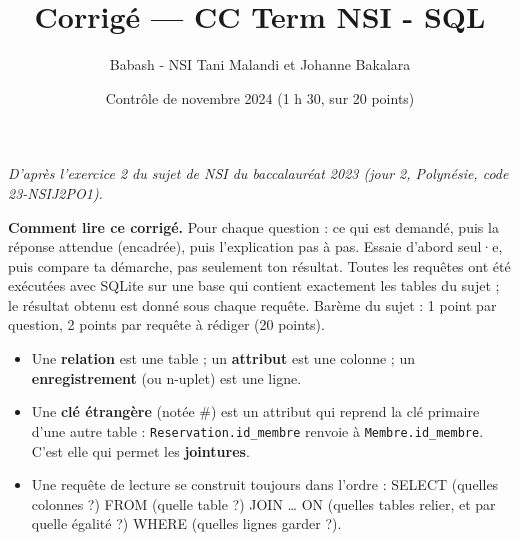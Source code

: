 \documentclass[11pt, a4paper]{exam}
\title{Corrigé — CC Term NSI - SQL}
\author{Babash - NSI Tani Malandi et Johanne Bakalara}
\date{Contrôle de novembre 2024 (1 h 30, sur 20 points)}
\newcommand{\code}[1]{\texttt{#1}}
\newcommand{\sql}[1]{\textsc{#1}}
\begin{document}
\pagestyle{headandfoot}
\firstpageheader{}{}{}
\runningheadrule
{}

\maketitle
\thispagestyle{headandfoot}
\begin{center}\footnotesize\itshape D'après l'exercice 2 du sujet de NSI du baccalauréat 2023 (jour 2, Polynésie, code 23-NSIJ2PO1).\end{center}

\begin{tcolorbox}[colback=white, colframe=black, boxrule=0.5pt, arc=1mm, left=2mm, right=2mm]
\small\textbf{Comment lire ce corrigé.} Pour chaque question : ce qui est demandé, puis la réponse attendue (encadrée), puis l'explication pas à pas. Essaie d'abord seul·e, puis compare ta démarche, pas seulement ton résultat.
Toutes les requêtes ont été exécutées avec SQLite sur une base qui contient exactement les tables du sujet ; le résultat obtenu est donné sous chaque requête.
Barème du sujet : 1 point par question, 2 points par requête à rédiger (20 points).
\end{tcolorbox}

\begin{retenir}
\begin{itemize}
\item Une \textbf{relation} est une table ; un \textbf{attribut} est une colonne ; un \textbf{enregistrement} (ou n-uplet) est une ligne.
\item Une \textbf{clé étrangère} (notée \#) est un attribut qui reprend la clé primaire d'une autre table : \code{Reservation.id\_membre} renvoie à \code{Membre.id\_membre}. C'est elle qui permet les \textbf{jointures}.
\item Une requête de lecture se construit toujours dans l'ordre : \sql{SELECT} (quelles colonnes ?) \sql{FROM} (quelle table ?) \sql{JOIN} \ldots{} \sql{ON} (quelles tables relier, et par quelle égalité ?) \sql{WHERE} (quelles lignes garder ?).
\end{itemize}
\end{retenir}
\end{document}
